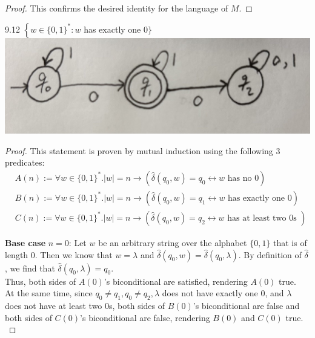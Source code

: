 \documentclass[10pt]{article}
\begin{document}
\begin{enumerate}[label={}]
\begin{proof}
              This confirms the desired identity for the language of $M$.

          \end{proof}

          \newpage

          9.12 $\left\{w \in\{0,1\}^*: w\right.$ has exactly one 0$\}$\\
          \includegraphics[scale=0.1]{9.12}
          \begin{proof}
              This statement is proven by mutual induction using the following 3 predicates:\\
              $$
                  \begin{aligned}
                       & A(n):=\forall w \in\{0,1\}^* .|w|=n \rightarrow\left(\hat{\delta}\left(q_0, w\right)=q_0 \leftrightarrow w \text { has no } 0\right)            \\
                       & B(n):=\forall w \in\{0,1\}^* .|w|=n \rightarrow\left(\hat{\delta}\left(q_0, w\right)=q_1 \leftrightarrow w \text { has exactly one } 0\right)   \\
                       & C(n):=\forall w \in\{0,1\}^* .|w|=n \rightarrow\left(\hat{\delta}\left(q_0, w\right)=q_2 \leftrightarrow w \text { has at least two 0s }\right)
                  \end{aligned}
              $$

              \textbf{Base case} $n=0$: Let $w$ be an arbitrary string over the alphabet $\{0,1\}$ that is of length 0. Then we know that $w=\lambda$ and $\hat{\delta}\left(q_0, w\right)=\hat{\delta}\left(q_0, \lambda\right)$. By definition of $\hat{\delta}$, we find that $\hat{\delta}\left(q_0, \lambda\right)=q_0$.\\
              Thus, both sides of $A(0)$'s biconditional are satisfied, rendering $A(0)$ true.\\
              At the same time, since $q_0 \neq q_1, q_0 \neq q_2, \lambda$ does not have exactly one 0, and $\lambda$ does not have at least two 0s, both sides of $B(0)$'s biconditional are false and both sides of $C(0)$'s biconditional are false, rendering $B(0)$ and $C(0)$ true.\\


\end{proof}
\end{enumerate}
\end{document}
